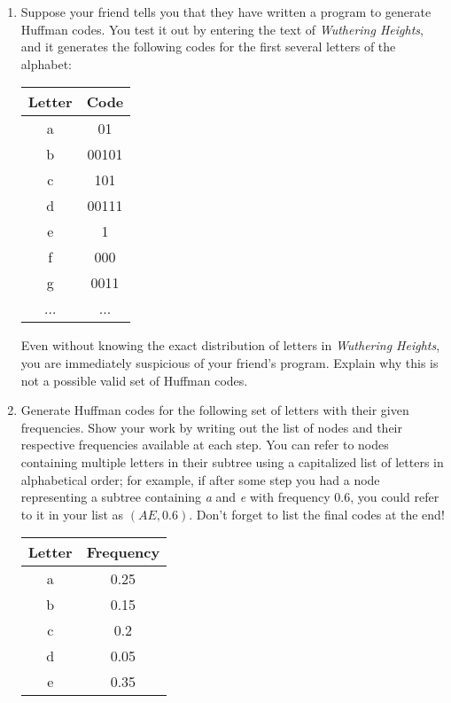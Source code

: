 \documentclass[9pt]{article}
\begin{document}
\begin{enumerate}

\item Suppose your friend tells you that they have written a program to generate Huffman codes. You test it out by entering the text of \textit{Wuthering Heights}, and it generates the following codes for the first several letters of the alphabet:

\begin{center}
\begin{tabular}{c|c}
Letter & Code \\ \hline
a & 01 \\ 
b & 00101 \\
c & 101 \\
d & 00111 \\
e & 1 \\
f & 000 \\
g & 0011 \\
... & ...
\end{tabular}
\end{center}

Even without knowing the exact distribution of letters in \textit{Wuthering Heights}, you are immediately suspicious of your friend's program. Explain why this is not a possible valid set of Huffman codes.

\item Generate Huffman codes for the following set of letters with their given frequencies. Show your work by writing out the list of nodes and their respective frequencies available at each step. You can refer to nodes containing multiple letters in their subtree using a capitalized list of letters in alphabetical order; for example, if after some step you had a node representing a subtree containing \textit{a} and \textit{e} with frequency 0.6, you could refer to it in your list as $(AE, 0.6)$. Don't forget to list the final codes at the end!

\begin{center}
\begin{tabular}{c|c}
Letter & Frequency \\ \hline
a & 0.25 \\ 
b & 0.15 \\
c & 0.2 \\
d & 0.05 \\
e & 0.35
\end{tabular}
\end{center}


\end{enumerate}
\end{document}
